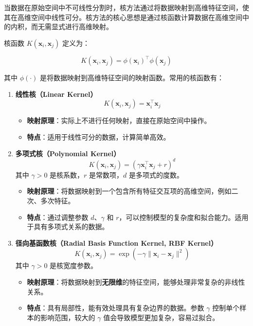 \documentclass[a4paper,11pt,AutoFakeBold]{ctexart}
\begin{document}
当数据在原始空间中不可线性分割时，核方法通过将数据映射到高维特征空间，使其在高维空间中线性可分。核方法的核心思想是通过核函数计算数据在高维空间中的内积，而无需显式进行高维映射。

核函数 $K(\mathbf{x}_i, \mathbf{x}_j)$ 定义为：

\begin{equation}
K(\mathbf{x}_i, \mathbf{x}_j) = \phi(\mathbf{x}_i)^\top \phi(\mathbf{x}_j)
\end{equation}

其中 $\phi(\cdot)$ 是将数据映射到高维特征空间的映射函数。常用的核函数有：

\begin{enumerate}
    \item \textbf{线性核（Linear Kernel）}
    \begin{equation}
    K(\mathbf{x}_i, \mathbf{x}_j) = \mathbf{x}_i^\top \mathbf{x}_j
    \end{equation}
    \begin{itemize}
        \item \textbf{映射原理}：实际上不进行任何映射，直接在原始空间中操作。
        \item \textbf{特点}：适用于线性可分的数据，计算简单高效。
    \end{itemize}
    
    \item \textbf{多项式核（Polynomial Kernel）}
    \begin{equation}
    K(\mathbf{x}_i, \mathbf{x}_j) = (\gamma \mathbf{x}_i^\top \mathbf{x}_j + r)^d
    \end{equation}
    其中 $\gamma > 0$ 是核系数，$r$ 是常数项，$d$ 是多项式的度数。
    \begin{itemize}
        \item \textbf{映射原理}：将数据映射到一个包含所有特征交互项的高维空间，例如二次、多次特征。
        \item \textbf{特点}：通过调整参数 $d$、$\gamma$ 和 $r$，可以控制模型的复杂度和拟合能力。适用于具有多项式关系的数据。
    \end{itemize}
    
    \item \textbf{径向基函数核（Radial Basis Function Kernel, RBF Kernel）}
    \begin{equation}
    K(\mathbf{x}_i, \mathbf{x}_j) = \exp(-\gamma \|\mathbf{x}_i - \mathbf{x}_j\|^2)
    \end{equation}
    其中 $\gamma > 0$ 是核宽度参数。
    \begin{itemize}
        \item \textbf{映射原理}：将数据映射到\textbf{无限维}的特征空间，能够处理非常复杂的非线性关系。
        \item \textbf{特点}：具有局部性，能有效处理具有复杂边界的数据。参数 $\gamma$ 控制单个样本的影响范围，较大的 $\gamma$ 值会导致模型更加复杂，容易过拟合。
    \end{itemize}
    

\end{enumerate}
\end{document}
